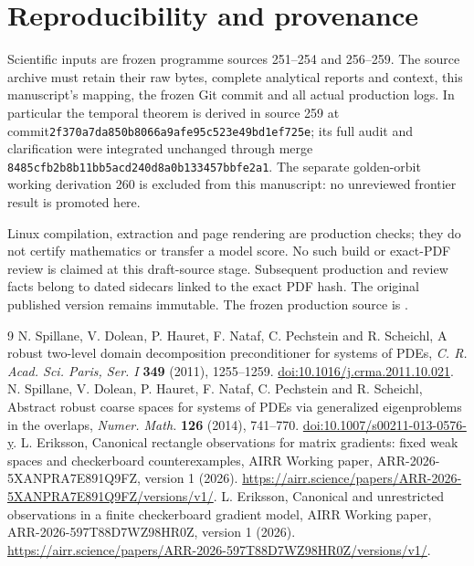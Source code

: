 \documentclass[11pt,a4paper]{article}
\providecommand{\SourceCommit}{\errmessage{A frozen SourceCommit must be supplied}}
\begin{document}
\section*{Reproducibility and provenance}
Scientific inputs are frozen programme sources 251--254 and 256--259.
The source archive must retain their raw bytes, complete analytical reports
and context, this manuscript's mapping, the frozen Git commit and all actual
production logs. In particular the temporal theorem is derived in source 259
at commit\texttt{2f370a7da850b8066a9afe95c523e49bd1ef725e}; its full audit
and clarification were integrated unchanged through merge
\texttt{8485cfb2b8b11bb5acd240d8a0b133457bbfe2a1}.
The separate golden-orbit working derivation 260 is excluded from this
manuscript: no unreviewed frontier result is promoted here.

Linux compilation, extraction and page rendering are production checks;
they do not certify mathematics or transfer a model score. No such build
or exact-PDF review is claimed at this draft-source stage. Subsequent
production and review facts belong to dated sidecars linked to the exact
PDF hash. The original published version remains immutable. The frozen
production source is \texttt{\SourceCommit}.

\begin{thebibliography}{9}
N. Spillane, V. Dolean, P. Hauret, F. Nataf, C. Pechstein and R. Scheichl,
A robust two-level domain decomposition preconditioner for systems of PDEs,
\emph{C. R. Acad. Sci. Paris, Ser. I} \textbf{349} (2011), 1255--1259.
\href{https://doi.org/10.1016/j.crma.2011.10.021}{doi:10.1016/j.crma.2011.10.021}.
N. Spillane, V. Dolean, P. Hauret, F. Nataf, C. Pechstein and R. Scheichl,
Abstract robust coarse spaces for systems of PDEs via generalized eigenproblems
in the overlaps, \emph{Numer. Math.} \textbf{126} (2014), 741--770.
\href{https://doi.org/10.1007/s00211-013-0576-y}{doi:10.1007/s00211-013-0576-y}.
L. Eriksson, Canonical rectangle observations for matrix gradients: fixed weak
spaces and checkerboard counterexamples, AIRR Working paper,
ARR-2026-5XANPRA7E891Q9FZ, version 1 (2026).
\url{https://airr.science/papers/ARR-2026-5XANPRA7E891Q9FZ/versions/v1/}.
L. Eriksson, Canonical and unrestricted observations in a finite checkerboard
gradient model, AIRR Working paper, ARR-2026-597T88D7WZ98HR0Z,
version 1 (2026).
\url{https://airr.science/papers/ARR-2026-597T88D7WZ98HR0Z/versions/v1/}.
\end{thebibliography}
\end{document}
